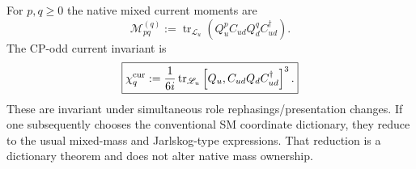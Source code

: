 \documentclass[12pt,a4paper]{article}
\begin{document}
\begin{theorem}
\label{p5:thm:v3101-current-based-quark-invariants}
For $p,q\ge0$ the native mixed current moments are
\[
 \boxed{
 \mathcal M_{pq}^{(q)}
 :=\operatorname{tr}_{\mathscr L_u}
 \left(Q_u^pC_{ud}Q_d^qC_{ud}^\dagger\right).}
\]
The CP-odd current invariant is
\[
 \boxed{
 \chi_q^{\rm cur}
 :=\frac1{6i}\operatorname{tr}_{\mathscr L_u}
 \left[Q_u,C_{ud}Q_dC_{ud}^\dagger\right]^3.}
\]
These are invariant under simultaneous role rephasings/presentation changes.
If one subsequently chooses the conventional SM coordinate dictionary, they
reduce to the usual mixed-mass and Jarlskog-type expressions.  That reduction
is a dictionary theorem and does not alter native mass ownership.
\end{theorem}
\end{document}
